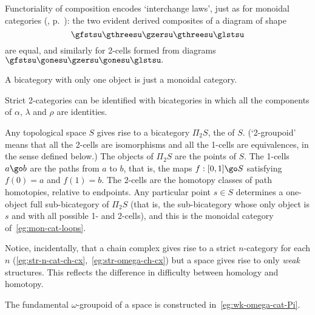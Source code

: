 Functoriality of composition encodes `interchange%
%
%
laws', just as for
monoidal categories (,
p.~\pageref{eq:mon-interchange}): the two evident derived composites of a
diagram of shape
\[
\gfstsu
\gthreesu 
\gzersu
\gthreesu 
\glstsu
\]
are equal, and similarly for 2-cells formed from diagrams
$
\gfstsu
\gonesu %
\gzersu
\gonesu %
\glstsu.
$
 

\begin{example}	
A bicategory%
%
%
with only one object is just a monoidal category.
\end{example}

\begin{example}
Strict 2-categories can be identified with bicategories in which all the
components of $\alpha$, $\lambda$ and $\rho$ are identities.
\end{example}

\begin{example}	
Any topological space $S$ gives rise to a bicategory $\Pi_2 S$,%
% 
% 
the
 of $S$.  (`2-groupoid' means that all the
2-cells are isomorphisms and all the 1-cells are equivalences, in the sense
defined below.)  The objects of $\Pi_2 S$ are the points of $S$.  The
1-cells $a \go b$ are the paths%
%
%
from $a$ to $b$, that is, the maps $f: [0,1] \go S$ satisfying $f(0) = a$
and $f(1) = b$.  The 2-cells are the homotopy classes of path homotopies,
relative to endpoints.  Any particular point $s \in S$ determines a
one-object full sub-bicategory of $\Pi_2 S$ (that is, the sub-bicategory
whose only object is $s$ and with all possible 1- and 2-cells), and this is
the monoidal category of~\ref{eg:mon-cat-loops}.

Notice, incidentally, that a chain%
%
%
%
%
complex gives rise to a strict
$n$-category for each $n$
(\ref{eg:str-n-cat-ch-cx},~\ref{eg:str-omega-ch-cx}) but a space gives rise
to only \emph{weak}%
%
%
structures.  This reflects the difference in difficulty
between homology%
%
%
and homotopy.%
%
%

The fundamental $\omega$-groupoid of a space is constructed
in~\ref{eg:wk-omega-cat-Pi}.  
\end{example}

